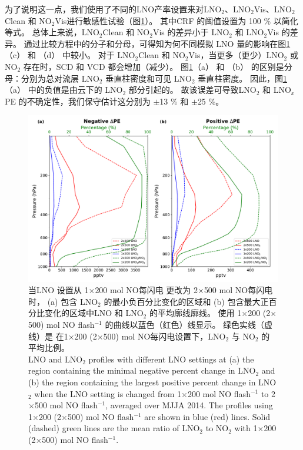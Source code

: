 为了说明这一点，我们使用了不同的LNO产率设置来对LNO$_2$、LNO$_2$Vis、LNO$_2$Clean 和 NO$_2$Vis进行敏感性试验（图\ref{fig:lno2_profile}）。
其中CRF 的阈值设置为 100 \% 以简化等式。
总体上来说，LNO$_2$Clean 和 NO$_2$Vis 的差异小于 LNO$_2$ 和 LNO$_2$Vis 的差异。
通过比较方程中的分子和分母，可得知为何不同模拟 LNO 量的影响在图\ref{fig:lno2_profile}（c） 和 （d） 中较小。
对于 LNO$_2$Clean 和 NO$_2$Vis，当更多（更少）LNO$_2$ 或 NO$_2$ 存在时，SCD 和 VCD 都会增加（减少）。
图\ref{fig:lno2_profile}（a） 和 （b） 的区别是分母：分别为总对流层 LNO$_2$ 垂直柱密度和可见 LNO$_2$ 垂直柱密度。
因此，图\ref{fig:lno2_profile}（a） 中的负值是由云下的 LNO$_2$ 部分引起的。
故该误差可导致LNO$_2$ 和 LNO$_x$ PE 的不确定性，我们保守估计这分别为 $\pm$13 \% 和 $\pm$25 \%。

\begin{figure}[t]
\centering
\includegraphics[width=13cm]{./figures/lno2_profile.pdf}
\caption{当LNO 设置从 1$\times$200 mol NO每闪电 更改为 2$\times$500 mol NO每闪电 时，
(a) 包含 LNO$_\textrm{2}$ 的最小负百分比变化的区域和 (b) 包含最大正百分比变化的区域中LNO 和 LNO$_\textrm{2}$ 的平均廓线廓线。
使用 1$\times$200 (2$\times$500) mol NO flash$^{-1}$ 的曲线以蓝色（红色）线显示。
绿色实线（虚线）是 在1$\times$200 (2$\times$500) mol NO每闪电设置下，LNO$_\textrm{2}$ 与 NO$_\textrm{2}$ 的平均比例。\\
LNO and LNO$_\textrm{2}$ profiles with different LNO settings at (a) the region containing the minimal negative percent change in LNO$_\textrm{2}$ and (b) the region containing the largest positive percent change in LNO$_\textrm{2}$ when the LNO setting is changed from 1$\times$200 mol NO flash$^{-1}$ to 2$\times$500 mol NO flash$^{-1}$, averaged over MJJA 2014.
The profiles using 1$\times$200 (2$\times$500) mol NO flash$^{-1}$ are shown in blue (red) lines.
Solid (dashed) green lines are the mean ratio of LNO$_\textrm{2}$ to NO$_\textrm{2}$ with 1$\times$200 (2$\times$500) mol NO flash$^{-1}$.}
\label{fig:lno2_profile}
\end{figure}


